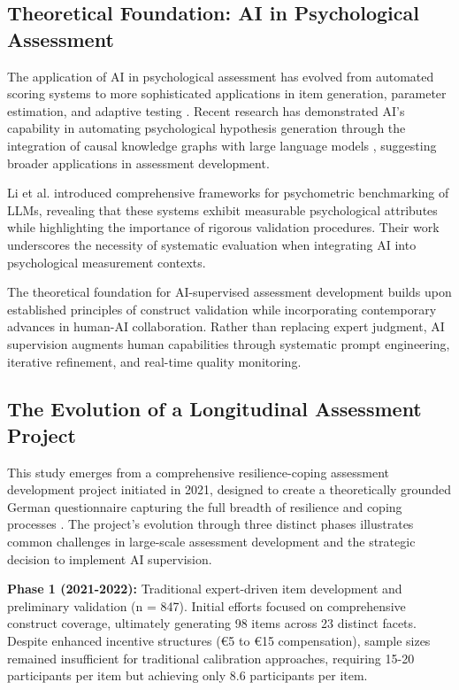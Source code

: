 \documentclass[12pt,a4paper]{article}
\begin{document}
\subsection{Theoretical Foundation: AI in Psychological Assessment}

The application of AI in psychological assessment has evolved from automated scoring systems \cite{Shermis2013} to more sophisticated applications in item generation, parameter estimation, and adaptive testing \cite{Chen2021, Yan2020}. Recent research has demonstrated AI's capability in automating psychological hypothesis generation through the integration of causal knowledge graphs with large language models \cite{Tong2024}, suggesting broader applications in assessment development.

Li et al. \cite{Li2024} introduced comprehensive frameworks for psychometric benchmarking of LLMs, revealing that these systems exhibit measurable psychological attributes while highlighting the importance of rigorous validation procedures. Their work underscores the necessity of systematic evaluation when integrating AI into psychological measurement contexts.

The theoretical foundation for AI-supervised assessment development builds upon established principles of construct validation \cite{Messick1995, Cronbach1955} while incorporating contemporary advances in human-AI collaboration. Rather than replacing expert judgment, AI supervision augments human capabilities through systematic prompt engineering, iterative refinement, and real-time quality monitoring.

\subsection{The Evolution of a Longitudinal Assessment Project}

This study emerges from a comprehensive resilience-coping assessment development project initiated in 2021, designed to create a theoretically grounded German questionnaire capturing the full breadth of resilience and coping processes \cite{Bonanno2004, Southwick2014}. The project's evolution through three distinct phases illustrates common challenges in large-scale assessment development and the strategic decision to implement AI supervision.

\textbf{Phase 1 (2021-2022):} Traditional expert-driven item development and preliminary validation (n = 847). Initial efforts focused on comprehensive construct coverage, ultimately generating 98 items across 23 distinct facets. Despite enhanced incentive structures (€5 to €15 compensation), sample sizes remained insufficient for traditional calibration approaches, requiring 15-20 participants per item \cite{DeAyala2009} but achieving only 8.6 participants per item.
\end{document}
